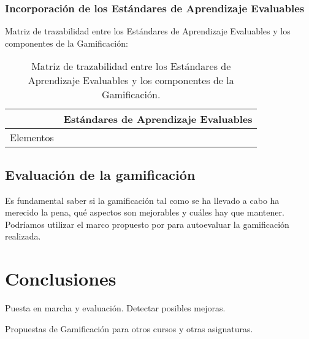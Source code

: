 \documentclass[a4paper, 12pt]{book}
\begin{document}
\subsection{Incorporación de los Estándares de Aprendizaje Evaluables}

Matriz de trazabilidad entre los Estándares de Aprendizaje Evaluables y los componentes de la Gamificación:
\begin{table}[hbtp]
\begin{tabular}{c|c}
& Estándares de Aprendizaje Evaluables\\\hline
Elementos & \\\hline
\end{tabular}
\label{Trazabilidad}
\caption{Matriz de trazabilidad entre los Estándares de Aprendizaje Evaluables y los componentes de la Gamificación.}
\end{table}


\section{Evaluación de la gamificación}

Es fundamental saber si la gamificación tal como se ha llevado a cabo ha merecido la pena, qué aspectos son mejorables y cuáles hay que mantener.
%
Podríamos utilizar el marco propuesto por \cite{EvaluacionGamificacion} para autoevaluar la gamificación realizada.



\cleardoublepage
\chapter{Conclusiones}
\label{chap:conclusiones}



\label{sec:trabajos_futuros}

Puesta en marcha y evaluación. Detectar posibles mejoras.

Propuestas de Gamificación para otros cursos y otras asignaturas.
\end{document}
